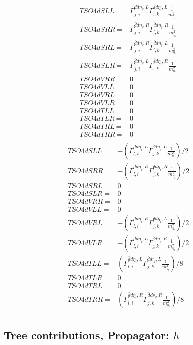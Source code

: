 \documentclass[A4,landscape]{article}
\begin{document}
\begin{align} 
  TSO4dSLL= & \Gamma^{\bar{d}d \eta_i ,L}_{j, i} \Gamma^{\bar{d}d \eta_i ,L}_{l, k} \frac{1}{m^2_{\eta_i}} \\ 
  TSO4dSRR= & \Gamma^{\bar{d}d \eta_i ,R}_{j, i} \Gamma^{\bar{d}d \eta_i ,R}_{l, k} \frac{1}{m^2_{\eta_i}} \\ 
  TSO4dSRL= & \Gamma^{\bar{d}d \eta_i ,R}_{j, i} \Gamma^{\bar{d}d \eta_i ,L}_{l, k} \frac{1}{m^2_{\eta_i}} \\ 
  TSO4dSLR= & \Gamma^{\bar{d}d \eta_i ,L}_{j, i} \Gamma^{\bar{d}d \eta_i ,R}_{l, k} \frac{1}{m^2_{\eta_i}} \\ 
  TSO4dVRR= & 0 \\ 
  TSO4dVLL= & 0 \\ 
  TSO4dVRL= & 0 \\ 
  TSO4dVLR= & 0 \\ 
  TSO4dTLL= & 0 \\ 
  TSO4dTLR= & 0 \\ 
  TSO4dTRL= & 0 \\ 
  TSO4dTRR= & 0 \\ 
\end{align} 
\begin{align} 
  TSO4dSLL= & -(\Gamma^{\bar{d}d \eta_i ,L}_{l, i} \Gamma^{\bar{d}d \eta_i ,L}_{j, k} \frac{1}{m^2_{\eta_i}})/2 \\ 
  TSO4dSRR= & -(\Gamma^{\bar{d}d \eta_i ,R}_{l, i} \Gamma^{\bar{d}d \eta_i ,R}_{j, k} \frac{1}{m^2_{\eta_i}})/2 \\ 
  TSO4dSRL= & 0 \\ 
  TSO4dSLR= & 0 \\ 
  TSO4dVRR= & 0 \\ 
  TSO4dVLL= & 0 \\ 
  TSO4dVRL= & -(\Gamma^{\bar{d}d \eta_i ,R}_{l, i} \Gamma^{\bar{d}d \eta_i ,L}_{j, k} \frac{1}{m^2_{\eta_i}})/2 \\ 
  TSO4dVLR= & -(\Gamma^{\bar{d}d \eta_i ,L}_{l, i} \Gamma^{\bar{d}d \eta_i ,R}_{j, k} \frac{1}{m^2_{\eta_i}})/2 \\ 
  TSO4dTLL= & (\Gamma^{\bar{d}d \eta_i ,L}_{l, i} \Gamma^{\bar{d}d \eta_i ,L}_{j, k} \frac{1}{m^2_{\eta_i}})/8 \\ 
  TSO4dTLR= & 0 \\ 
  TSO4dTRL= & 0 \\ 
  TSO4dTRR= & (\Gamma^{\bar{d}d \eta_i ,R}_{l, i} \Gamma^{\bar{d}d \eta_i ,R}_{j, k} \frac{1}{m^2_{\eta_i}})/8 \\ 
\end{align} 
\subsection{Tree contributions, Propagator: $h$} 
\end{document}
